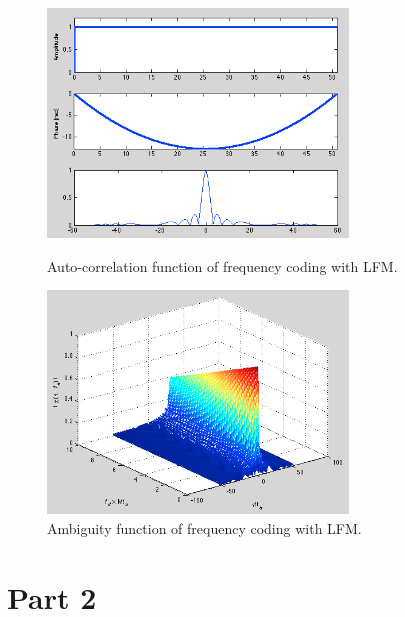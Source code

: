 \documentclass{article}
\begin{document}
\begin{figure}[htb]
\begin{minipage}[t]{0.5\linewidth}
\centering
\includegraphics[width=8cm]{Figures/lfm_data.png}
\caption{Auto-correlation function of frequency coding with LFM.}
\label{fig:lfm_data}
\end{minipage}
\begin{minipage}[t]{0.5\linewidth}
\centering
\includegraphics[width=8cm]{Figures/lfm_3d.png}
\caption{Ambiguity function of frequency coding with LFM.}
\label{fig:lfm_3d}
\end{minipage}
\end{figure}


\section{Part 2}

\end{document}
